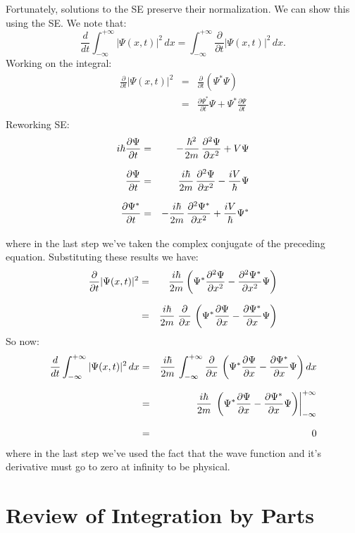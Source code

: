 \documentclass[12pt]{book}
\begin{document}
Fortunately, solutions to the SE preserve their normalization.  We can show this using the SE.  We note that:
$$\frac{d}{dt}\int_{-\infty}^{+\infty} |\Psi(x,t)|^2 \, dx  = 
\int_{-\infty}^{+\infty} \frac{\partial}{\partial t} |\Psi(x,t)|^2\, dx.$$ 
Working on the integral:
\begin{eqnarray*}
\frac{\partial}{\partial t} |\Psi(x,t)|^2 &=&  \frac{\partial}{\partial t} (\Psi^* \Psi) \\[7pt]
  &=&  \frac{\partial \Psi^*}{\partial t} \Psi + \Psi^* \frac{\partial \Psi}{\partial t} \\
\end{eqnarray*}
Reworking SE:
\begin{eqnarray*}
\label{eqn:se}
i \hbar  \frac{\partial \Psi}{\partial t}  &=& -  \frac{\hbar^2}{2 m}\, \frac{\partial^2 \Psi}{\partial x^2}  + V \Psi \\[7pt] 
        \frac{\partial \Psi}{\partial t}  &=& \;\; \frac{i \hbar}{2 m}\, \frac{\partial^2 \Psi}{\partial x^2}  - \frac{i V}{\hbar} \Psi \\[7pt]
        \frac{\partial \Psi^*}{\partial t}  &=& - \frac{i \hbar}{2 m}\, \frac{\partial^2 \Psi^*}{\partial x^2}  + \frac{i V}{\hbar} \Psi^* \\[7pt]
\end{eqnarray*}
where in the last step we've taken the complex conjugate of the preceding equation.  Substituting these results we have:
\begin{eqnarray}
\frac{\partial}{\partial t} |\Psi(x,t)|^2 &=&  \frac{i \hbar}{2 m} 
\left( \Psi^*  \frac{\partial^2 \Psi}{\partial x^2}  -  \frac{\partial^2 \Psi^*}{\partial x^2}  \Psi\right) \notag \\[7pt]
\label{eqn:dtpp}
  &=& \frac{i \hbar}{2 m} \;
\frac{\partial}{\partial x} \, \left( \Psi^*  \frac{\partial \Psi}{\partial x}  -  \frac{\partial \Psi^*}{\partial x}  \Psi\right)
\end{eqnarray}
So now:
\begin{eqnarray*}
\frac{d}{dt}\int_{-\infty}^{+\infty} |\Psi(x,t)|^2 \, dx  &=& 
\frac{i \hbar}{2 m} \, \int_{-\infty}^{+\infty}  \frac{\partial}{\partial x} \, \left( \Psi^*  \frac{\partial \Psi}{\partial x}  -  \frac{\partial \Psi^*}{\partial x}  \Psi\right) dx\\[7pt]
&=&  \frac{i \hbar}{2 m} \, \left. \left( \Psi^*  \frac{\partial \Psi}{\partial x}  -  \frac{\partial \Psi^*}{\partial x}  \Psi\right) 
\right\rvert_{-\infty}^{+\infty}\\[7pt]
&=& 0
\end{eqnarray*}
where in the last step we've used the fact that the wave function and it's derivative must go to zero at infinity to be physical.

\section{Review of Integration by Parts}
\end{document}
